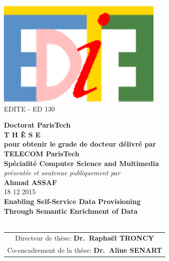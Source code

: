 \documentclass[11pt,a4paper]{book}
\renewcommand\textnumero{n$^{\textsf{{\tiny O}}}$}
\begin{document}
\begin{center}
%


\includegraphics[scale=0.65]{figures/logo_edite.pdf} \\
{\small {EDITE - ED 130}}


%
\vspace{.5cm}
%
%
%
%
%
%
\vspace{1.0cm}
%
%
%
{\LARGE {\bf Doctorat ParisTech}}\\
\vspace{1.1cm}
{\LARGE {\bf T H È S E}}\\
\vspace{0.5cm}
{\normalsize {\bf pour obtenir le grade de docteur délivré par}}\\
%
%
%
\vspace{.9cm}
%
%
%
%
{\LARGE {\bf TELECOM ParisTech}}\\
\vspace{0.6cm}
{\Large {\bf Spécialité \og Computer Science and Multimedia \fg}}\\
%
%
%
\vspace{.8cm}
%
%
%
{\normalsize {\it présentée et soutenue publiquement par}}\\
\vspace{0.7cm}
{\Large {\bf Ahmad ASSAF}}\\
\vspace{0.24cm}
{\normalsize 18 12 2015}\\
%
%
%
\vfill
%
%
%
\textcolor[RGB]{191,18,56}{
\noindent
{\LARGE {\bf Enabling Self-Service Data Provisioning\\[.6cm]Through Semantic Enrichment of Data}}\\
}
%
%
%
\vfill~\vfill
%
%
%
{\normalsize
\begin{tabular}{c}
Directeur de thèse:					{\bf Dr.\ Rapha\"el TRONCY}\\
Co-encadrement de la thèse:		{\bf Dr.\ Aline SENART}
\end{tabular}
}
\end{center}
\end{document}
